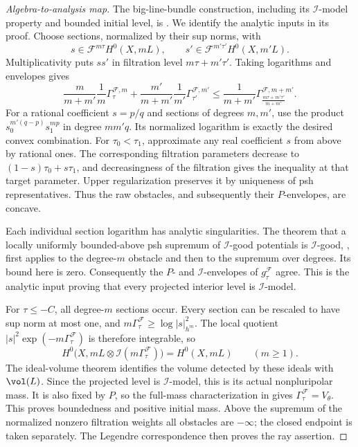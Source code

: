 \begin{proof}[Algebra-to-analysis map]
The big-line-bundle construction, including its $\mathcal I$-model
property and bounded initial level, is \cite[Example~9.3.1]{XiaBook}.
We identify the analytic inputs in its proof.
Choose sections, normalized by their sup norms, with
\[
 s\in\mathcal F^{m\tau}H^0(X,mL),
 \qquad
 s'\in\mathcal F^{m'\tau'}H^0(X,m'L).
\]
Multiplicativity puts $ss'$ in filtration level
$m\tau+m'\tau'$.  Taking logarithms and envelopes gives
\[
 \frac{m}{m+m'}\frac1m\Gamma_\tau^{\mathcal F,m}
 +\frac{m'}{m+m'}\frac1{m'}\Gamma_{\tau'}^{\mathcal F,m'}
 \leq
 \frac1{m+m'}
 \Gamma_{\frac{m\tau+m'\tau'}{m+m'}}^{\mathcal F,m+m'}.
\]
For a rational coefficient $s=p/q$ and sections of degrees $m,m'$,
use the product $s_0^{m'(q-p)}s_1^{mp}$ in degree $mm'q$.
Its normalized logarithm is exactly the desired convex combination.
For $\tau_0<\tau_1$, approximate any real coefficient $s$ from above
by rational ones.  The corresponding filtration parameters decrease
to $(1-s)\tau_0+s\tau_1$, and decreasingness of the filtration gives
the inequality at that target parameter.  Upper regularization
preserves it by uniqueness of psh representatives.  Thus the raw
obstacles, and subsequently their $P$-envelopes, are concave.

Each individual section logarithm has analytic singularities.
The theorem that a locally uniformly bounded-above psh supremum
of $\mathcal I$-good potentials is $\mathcal I$-good,
\cite[Proposition~7.2.2]{XiaBook}, first applies to the degree-$m$
obstacle and then to the supremum over degrees.  Its bound here is
zero.  Consequently the $P$- and $\mathcal I$-envelopes of
$g_\tau^{\mathcal F}$ agree.  This is the analytic input proving
that every projected interior level is $\mathcal I$-model.

For $\tau\leq-C$, all degree-$m$ sections occur.  Every section can
be rescaled to have sup norm at most one, and
$m\Gamma_\tau^{\mathcal F}\geq\log|s|_{h^m}^2$.  The local quotient
$|s|^2\exp(-m\Gamma_\tau^{\mathcal F})$ is therefore integrable,
so
\[
 H^0\bigl(X,mL\otimes\mathcal I(m\Gamma_\tau^{\mathcal F})\bigr)
 =H^0(X,mL)\qquad(m\geq1).
\]
The ideal-volume theorem \cite[Theorem~7.4.1]{XiaBook} identifies
the volume detected by these ideals with $\vol(L)$.
Since the projected level is $\mathcal I$-model, this is its actual
nonpluripolar mass.  It is also fixed by $P$, so the full-mass
characterization in  gives
$\Gamma_\tau^{\mathcal F}=V_\theta$.
This proves boundedness and positive initial mass.
Above the supremum of the normalized nonzero filtration weights
all obstacles are $-\infty$; the closed endpoint is taken separately.
The Legendre correspondence then proves the ray assertion.


\end{proof}
